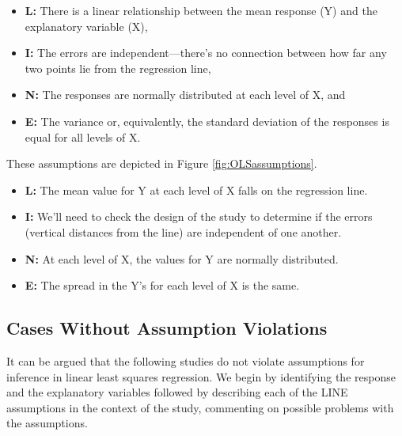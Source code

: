 \documentclass[
]{krantz}
\providecommand{\tightlist}{%
  \setlength{\itemsep}{0pt}\setlength{\parskip}{0pt}}
\begin{document}
\begin{itemize}
\tightlist
\item
  \textbf{L:} There is a linear relationship between the mean response (Y) and the explanatory variable (X),
\item
  \textbf{I:} The errors are independent---there's no connection between how far any two points lie from the regression line,
\item
  \textbf{N:} The responses are normally distributed at each level of X, and
\item
  \textbf{E:} The variance or, equivalently, the standard deviation of the responses is equal for all levels of X.
\end{itemize}

These assumptions are depicted in Figure \ref{fig:OLSassumptions}.

\begin{itemize}
\tightlist
\item
  \textbf{L:} The mean value for Y at each level of X falls on the regression line.
\item
  \textbf{I:} We'll need to check the design of the study to determine if the errors (vertical distances from the line) are independent of one another.
\item
  \textbf{N:} At each level of X, the values for Y are normally distributed.
\item
  \textbf{E:} The spread in the Y's for each level of X is the same.
\end{itemize}

\subsection{Cases Without Assumption Violations}\label{cases-without-assumption-violations}

It can be argued that the following studies do not violate assumptions for inference in linear least squares regression. We begin by identifying the response and the explanatory variables followed by describing each of the LINE assumptions in the context of the study, commenting on possible problems with the assumptions.
\end{document}
